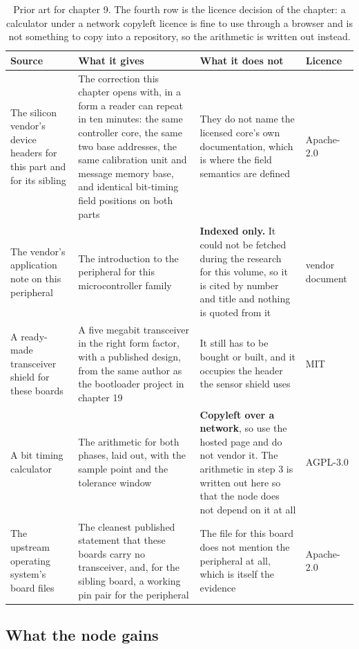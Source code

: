 \begin{table}[H]\centering\small
\begin{tabular}{p{34mm}p{46mm}p{38mm}p{20mm}}
\toprule
Source & What it gives & What it does not & Licence \\
\midrule
The silicon vendor's device headers for this part and for its sibling & The correction this chapter opens with, in a form a reader can repeat in ten minutes: the same controller core, the same two base addresses, the same calibration unit and message memory base, and identical bit-timing field positions on both parts & They do not name the licensed core's own documentation, which is where the field semantics are defined & Apache-2.0 \\
The vendor's application note on this peripheral & The introduction to the peripheral for this microcontroller family & \textbf{Indexed only.} It could not be fetched during the research for this volume, so it is cited by number and title and nothing is quoted from it & vendor document \\
A ready-made transceiver shield for these boards & A five megabit transceiver in the right form factor, with a published design, from the same author as the bootloader project in chapter 19 & It still has to be bought or built, and it occupies the header the sensor shield uses & MIT \\
A bit timing calculator & The arithmetic for both phases, laid out, with the sample point and the tolerance window & \textbf{Copyleft over a network}, so use the hosted page and do not vendor it. The arithmetic in step 3 is written out here so that the node does not depend on it at all & AGPL-3.0 \\
The upstream operating system's board files & The cleanest published statement that these boards carry no transceiver, and, for the sibling board, a working pin pair for the peripheral & The file for this board does not mention the peripheral at all, which is itself the evidence & Apache-2.0 \\
\bottomrule
\end{tabular}
\caption{Prior art for chapter 9. The fourth row is the licence decision of the chapter: a calculator under a network copyleft licence is fine to use through a browser and is not something to copy into a repository, so the arithmetic is written out instead.}
\end{table}

\subsection*{What the node gains}

